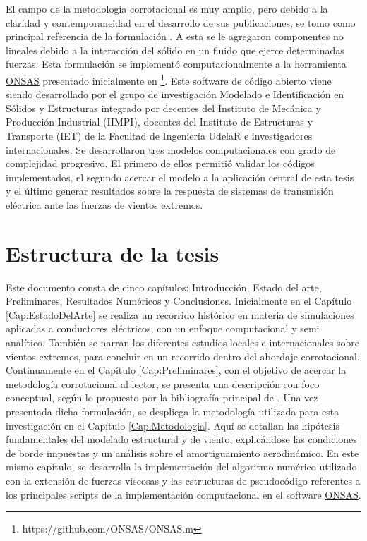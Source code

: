 El campo de la metodología corrotacional es muy amplio, pero debido a la claridad y contemporaneidad en el desarrollo de sus publicaciones, se tomo como principal referencia de la formulación \citep{Le2014}. A esta se le agregaron componentes no lineales debido a la interacción del sólido en un fluido que ejerce determinadas fuerzas. Esta formulación se implementó computacionalmente a la herramienta \href{https://github.com/ONSAS/ONSAS.m}{ONSAS} presentado inicialmente en \citep{bruno2017introduccion} \footnote{https://github.com/ONSAS/ONSAS.m}. Este software de código abierto viene siendo desarrollado por el grupo de investigación Modelado e Identificación en Sólidos y Estructuras integrado por decentes del Instituto de Mecánica y Producción Industrial (IIMPI), docentes del Instituto de Estructuras y Transporte (IET)  de la Facultad de Ingeniería UdelaR e investigadores internacionales. Se desarrollaron tres modelos computacionales con grado de complejidad progresivo. El primero de ellos permitió validar los códigos implementados, el segundo acercar el modelo a la aplicación central de esta tesis y el último generar resultados sobre la respuesta de sistemas de transmisión eléctrica ante las fuerzas de vientos extremos.


\section{Estructura de la tesis}

Este documento consta de cinco capítulos: Introducción, Estado del arte, Preliminares, Resultados Numéricos y Conclusiones. Inicialmente en el Capítulo \ref{Cap:EstadoDelArte} se realiza un recorrido histórico en materia de simulaciones aplicadas a conductores eléctricos, con un enfoque computacional y semi analítico. También se narran los diferentes estudios locales e internacionales sobre vientos extremos, para concluir en un recorrido dentro del abordaje corrotacional. Continuamente en el Capítulo \ref{Cap:Preliminares}, con el objetivo de acercar la metodología corrotacional al lector, se presenta una descripción con foco conceptual, según lo propuesto por la bibliografía principal de \citet{Le2014}. Una vez presentada dicha formulación, se despliega la metodología utilizada para esta investigación en el Capítulo \ref{Cap:Metodologia}. Aquí se detallan las hipótesis fundamentales del modelado estructural y de viento, explicándose las condiciones de borde impuestas y un análisis sobre el amortiguamiento aerodinámico. En este mismo capítulo, se desarrolla la implementación del algoritmo numérico utilizado con la extensión de fuerzas viscosas y las estructuras de pseudocódigo referentes a los principales scripts de la implementación computacional en el software \href{https://github.com/ONSAS/ONSAS/}{ONSAS}. 


